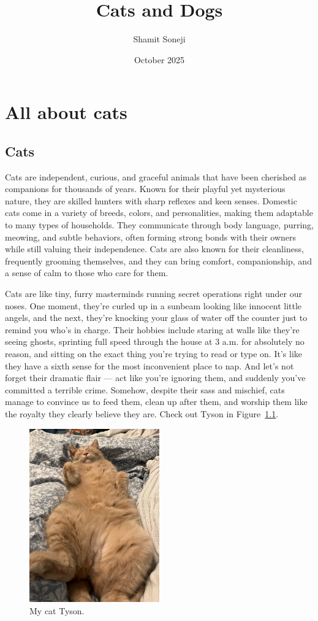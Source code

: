\documentclass[11pt,a4paper]{report}
\title{Cats and Dogs}
\author{Shamit Soneji}
\date{October 2025}
\begin{document}
\maketitle

\tableofcontents

\chapter{All about cats}
\section{Cats}
Cats are independent, curious, and graceful animals that have been cherished as companions for thousands of years. Known for their playful yet mysterious nature, they are skilled hunters with sharp reflexes and keen senses. Domestic cats come in a variety of breeds, colors, and personalities, making them adaptable to many types of households. They communicate through body language, purring, meowing, and subtle behaviors, often forming strong bonds with their owners while still valuing their independence. Cats are also known for their cleanliness, frequently grooming themselves, and they can bring comfort, companionship, and a sense of calm to those who care for them.

Cats are like tiny, furry masterminds running secret operations right under our noses. One moment, they’re curled up in a sunbeam looking like innocent little angels, and the next, they’re knocking your glass of water off the counter just to remind you who’s in charge. Their hobbies include staring at walls like they’re seeing ghosts, sprinting full speed through the house at 3 a.m. for absolutely no reason, and sitting on the exact thing you’re trying to read or type on. It’s like they have a sixth sense for the most inconvenient place to nap. And let’s not forget their dramatic flair — act like you’re ignoring them, and suddenly you’ve committed a terrible crime. Somehow, despite their sass and mischief, cats manage to convince us to feed them, clean up after them, and worship them like the royalty they clearly believe they are. Check out Tyson in Figure~\ref{fig:cat}.


\begin{figure}[h]
    \centering
    \includegraphics[width=0.5\textwidth]{figs/Cat.png}
    \caption{My cat Tyson.}
    \label{fig:cat}
\end{figure}
\end{document}
